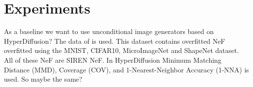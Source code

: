 \section{Experiments}
\label{sec:exper}
As a baseline we want to use unconditional image generators based on HyperDiffusion?
The data of \cite{papa2023train} is used. This dataset contains overfitted NeF overfitted using the
MNIST, CIFAR10, MicroImageNet and ShapeNet dataset. All of these NeF are SIREN NeF.
In HyperDiffusion Minimum Matching Distance (MMD), Coverage (COV), and 1-Nearest-Neighbor Accuracy (1-NNA) is
used. So maybe the same?
